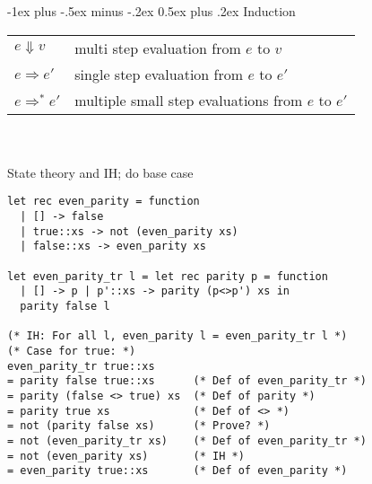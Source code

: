\documentclass[12pt]{article}
\makeatletter
\renewcommand{\section}{\@startsection{section}{1}{0mm}%
                                    {-1ex plus -.5ex minus -.2ex}%
                                    {0.5ex plus .2ex}%
                                    {\normalfont\large\bfseries\color{header}}}
\makeatother
\begin{document}
\begin{multicols}{2}
	\section{Induction}
	\begin{tabular}{l l}
	$e \Downarrow v$ 		& multi step evaluation from $e$ to $v$ 			\\
	$e \Rightarrow e'$ 		& single step evaluation from $e$ to $e'$ 			\\
	$e \Rightarrow^* e'$	& multiple small step evaluations from $e$ to $e'$ 	\\
    \end{tabular} \\~\\
    State theory and IH; do base case \\
    \begin{lstlisting}
let rec even_parity = function
  | [] -> false
  | true::xs -> not (even_parity xs)
  | false::xs -> even_parity xs

let even_parity_tr l = let rec parity p = function
  | [] -> p | p'::xs -> parity (p<>p') xs in
  parity false l

(* IH: For all l, even_parity l = even_parity_tr l *)   
(* Case for true: *)
even_parity_tr true::xs
= parity false true::xs      (* Def of even_parity_tr *)
= parity (false <> true) xs  (* Def of parity *)
= parity true xs             (* Def of <> *)
= not (parity false xs)      (* Prove? *)
= not (even_parity_tr xs)    (* Def of even_parity_tr *)
= not (even_parity xs)       (* IH *)
= even_parity true::xs       (* Def of even_parity *)

    \end{lstlisting}
	
	\begin{lstlisting}
	\end{lstlisting}
	
\end{multicols}

\pagebreak
\end{document}

